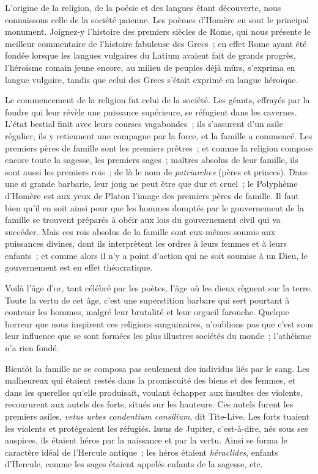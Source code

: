 \documentclass[french,twoside]{book} %
\begin{document}
\par
L’origine de la religion, de la poésie et des langues étant découverte, nous connaissons celle de la société païenne. Les poèmes d’Homère en sont le principal monument. Joignez-y l’histoire des premiers siècles de Rome, qui nous présente le meilleur commentaire de l’histoire fabuleuse des Grecs ; en effet Rome ayant été fondée lorsque les langues vulgaires du Latium avaient fait de grands progrès,  l’héroïsme romain jeune encore, au milieu de peuples déjà mûrs, s’exprima en langue vulgaire, tandis que celui des Grecs s’était exprimé en langue héroïque.\par
Le commencement de la religion fut celui de la société. Les géants, effrayés par la foudre qui leur révèle une puissance supérieure, se réfugient dans les cavernes. L’état bestial finit avec leurs courses vagabondes ; ils s’assurent d’un asile régulier, ils y retiennent une compagne par la force, et la famille a commencé. Les premiers pères de famille sont les premiers prêtres ; et comme la religion compose encore toute la sagesse, les premiers sages ; maîtres absolus de leur famille, ils sont aussi les premiers rois ; de là le nom de {\itshape patriarches} (pères et princes). Dans une si grande barbarie, leur joug ne peut être que dur et cruel ; le Polyphème d’Homère est aux yeux de Platon l’image des premiers pères de famille. Il faut bien qu’il en soit ainsi pour que les hommes domptés par le gouvernement de la famille se trouvent préparés à obéir aux lois du gouvernement civil qui va succéder. Mais ces rois absolus de la famille sont eux-mêmes soumis aux puissances divines, dont ils interprètent les ordres à leurs femmes et à leurs enfants ; et comme alors il n’y a point d’action qui ne soit soumise à un Dieu, le gouvernement est en effet théocratique.\par
 Voilà l’âge d’or, tant célébré par les poètes, l’âge où les dieux règnent sur la terre. Toute la vertu de cet âge, c’est une superstition barbare qui sert pourtant à contenir les hommes, malgré leur brutalité et leur orgueil farouche. Quelque horreur que nous inspirent ces religions sanguinaires, n’oublions pas que c’est sous leur influence que se sont formées les plus illustres sociétés du monde ; l’athéisme n’a rien fondé.\par
Bientôt la famille ne se composa pas seulement des individus liés par le sang. Les malheureux qui étaient restés dans la promiscuité des biens et des femmes, et dans les querelles qu’elle produisait, voulant échapper aux insultes des violents, recoururent aux autels des forts, situés sur les hauteurs. Ces autels furent les premiers asiles, \emph{{\itshape vetus urbes condentium consilium}}, dit Tite-Live. Les forts tuaient les violents et protégeaient les réfugiés. Issus de Jupiter, c’est-à-dire, nés sous ses auspices, ils étaient héros par la naissance et par la vertu. Ainsi se forma le caractère idéal de l’Hercule antique ; les héros étaient {\itshape héraclides}, enfants d’Hercule, comme les sages étaient appelés enfants de la sagesse, etc.\par
\end{document}
